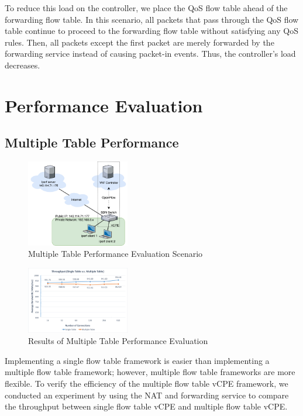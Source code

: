 \documentclass[conference]{IEEEtran}
\begin{document}
To reduce this load on the controller, we place the QoS flow table ahead of the forwarding flow table. In this scenario, all packets that pass through the QoS flow table continue to proceed to the forwarding flow table without satisfying any QoS rules. Then, all packets except the first packet are merely forwarded by the forwarding service instead of causing packet-in events. Thus, the controller’s load decreases.




\section{Performance Evaluation}
\subsection{Multiple Table Performance}

\begin{figure}[!t]
\centering
\includegraphics[width=0.4\textwidth]{./figures/evaluation_nat_scenario}
\caption{Multiple Table Performance Evaluation Scenario}
\label{fig:evaluation_nat_scenario}
\end{figure}

\begin{figure}[!t]
\centering
\includegraphics[width=0.4\textwidth]{./figures/evaluation_nat}
\caption{Results of Multiple Table Performance Evaluation}
\label{fig:evaluation_nat_result}
\end{figure}

Implementing a single flow table framework is easier than implementing a multiple flow table framework; however, multiple flow table frameworks are more flexible. To verify the efficiency of the multiple flow table vCPE framework, we conducted an experiment by using the NAT and forwarding service to compare the throughput between single flow table vCPE and multiple flow table vCPE.
\end{document}
